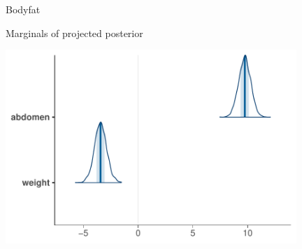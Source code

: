 \documentclass[english,t]{beamer}
\begin{document}
\begin{frame}
  
  {\Large\color{navyblue} Bodyfat}

  Marginals of projected posterior
  
  \includegraphics[width=11cm]{bodyfat_proj_mcmc_areas.pdf}

\end{frame}

  

  



  




  

  
\end{document}
